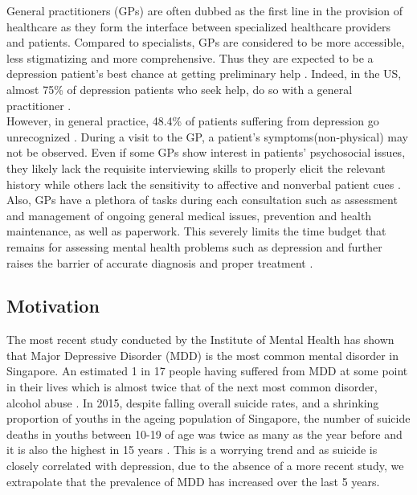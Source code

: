 \documentclass{article}
\begin{document}
	General practitioners (GPs) are often dubbed as the first line in the provision of healthcare as they form the interface between specialized healthcare providers and patients. Compared to specialists, GPs are considered to be more accessible, less stigmatizing and more comprehensive. Thus they are expected to be a depression patient's best chance at getting preliminary help \cite{rothman2003}. Indeed, in the US, almost 75\% of depression patients who seek help, do so with a general practitioner \cite{goldman1999}. \\ 

	However, in general practice, 48.4\% of patients suffering from depression go unrecognized \cite{jama2003}. During a visit to the GP, a patient's symptoms(non-physical) may not be observed. Even if some GPs show interest in patients' psychosocial issues, they likely lack the requisite interviewing skills to properly elicit the relevant history while others lack the sensitivity to affective and nonverbal patient cues \cite{badger1994}. Also, GPs have a plethora of tasks during each consultation such as assessment and management of ongoing general medical issues, prevention and health maintenance, as well as paperwork. This severely limits the time budget that remains for assessing mental health problems such as depression and further raises the barrier of accurate diagnosis and proper treatment \cite{telford2002}. \\

	\subsection{Motivation}
	The most recent study conducted by the Institute of Mental Health has shown that Major Depressive Disorder (MDD) is the most common mental disorder in Singapore. An estimated 1 in 17 people having suffered from MDD at some point in their lives which is almost twice that of the next most common disorder, alcohol abuse \cite{annacadmedsg}. In 2015, despite falling overall suicide rates, and a shrinking proportion of youths in the ageing population of Singapore, the number of suicide deaths in youths between 10-19 of age was twice as many as the year before and it is also the highest in 15 years \cite{samaritansofsingapore2016}. This is a worrying trend and as suicide is closely correlated with depression, due to the absence of a more recent study, we extrapolate that the prevalence of MDD has increased over the last 5 years. \\
\end{document}
